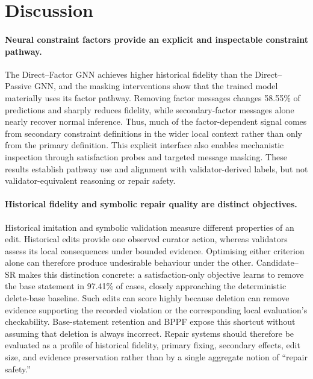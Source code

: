\documentclass[a4paper,UKenglish,cleveref,autoref,thm-restate]{tgdk-v2021}
\begin{document}
\section{Discussion}
\label{sec:discussion}

\paragraph*{Neural constraint factors provide an explicit and inspectable constraint pathway.} The Direct--Factor GNN achieves higher historical fidelity than the Direct--Passive GNN, and the masking interventions show that the trained model materially uses its factor pathway. Removing factor messages changes 58.55\% of predictions and sharply reduces fidelity, while secondary-factor messages alone nearly recover normal inference. Thus, much of the factor-dependent signal comes from secondary constraint definitions in the wider local context rather than only from the primary definition. This explicit interface also enables mechanistic inspection through satisfaction probes and targeted message masking. These results establish pathway use and alignment with validator-derived labels, but not validator-equivalent reasoning or repair safety. 

\paragraph*{Historical fidelity and symbolic repair quality are distinct objectives.} Historical imitation and symbolic validation measure different properties of an edit. Historical edits provide one observed curator action, whereas validators assess its local consequences under bounded evidence. Optimising either criterion alone can therefore produce undesirable behaviour under the other. Candidate--SR makes this distinction concrete: a satisfaction-only objective learns to remove the base statement in 97.41\% of cases, closely approaching the deterministic delete-base baseline. Such edits can score highly because deletion can remove evidence supporting the recorded violation or the corresponding local evaluation's checkability. Base-statement retention and BPPF expose this shortcut without assuming that deletion is always incorrect. Repair systems should therefore be evaluated as a profile of historical fidelity, primary fixing, secondary effects, edit size, and evidence preservation rather than by a single aggregate notion of ``repair safety.''
\end{document}
